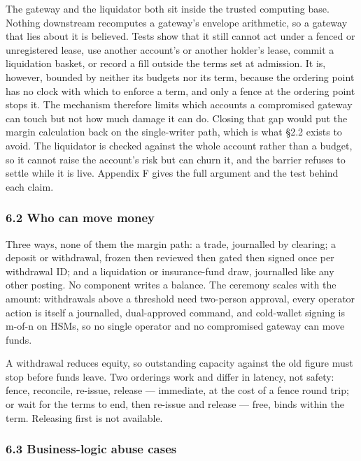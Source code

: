 \documentclass[10pt,a4paper]{article}
\newcounter{none}  %
\begin{document}
The gateway and the liquidator both sit inside the trusted computing base.
Nothing downstream recomputes a gateway's envelope arithmetic, so a gateway that
lies about it is believed. Tests show that it still cannot act under a fenced or
unregistered lease, use another account's or another holder's lease, commit a
liquidation basket, or record a fill outside the terms set at admission. It is,
however, bounded by neither its budgets nor its term, because the ordering point
has no clock with which to enforce a term, and only a fence at the ordering
point stops it. The mechanism therefore limits which accounts a compromised
gateway can touch but not how much damage it can do. Closing that gap would put
the margin calculation back on the single-writer path, which is what §2.2
exists to avoid. The liquidator is checked against the whole account rather
than a budget, so it cannot raise the account's risk but can churn it, and the
barrier refuses to settle while it is live. Appendix F gives the full argument
and the test behind each claim.

\subsubsection{6.2 Who can move money}\label{who-can-move-money}

Three ways, none of them the margin path: a trade, journalled by clearing; a
deposit or withdrawal, frozen then reviewed then gated then signed once per
withdrawal ID; and a liquidation or insurance-fund draw, journalled like any
other posting. No component writes a balance. The ceremony scales with the
amount: withdrawals above a threshold need two-person approval, every operator
action is itself a journalled, dual-approved command, and cold-wallet signing is
m-of-n on HSMs, so no single operator and no compromised gateway can move funds.

A withdrawal reduces equity, so outstanding capacity against the old figure must
stop before funds leave. Two orderings work and differ in latency, not safety:
fence, reconcile, re-issue, release --- immediate, at the cost of a fence round
trip; or wait for the terms to end, then re-issue and release --- free, binds
within the term. Releasing first is not available.

\subsubsection{6.3 Business-logic abuse cases}\label{business-logic-abuse-cases}
\end{document}
